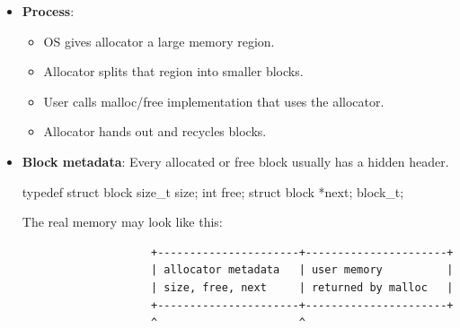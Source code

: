 \documentclass{report}
\begin{document}
\begin{itemize}
                \bigbreak \noindent 
                For mmap allocations, you still need metadata, but you must remember the exact mapping size, because munmap requires the address and length:
                \bigbreak \noindent 
                mmap is naturally page-oriented. If the page size is 4096, then an allocation using mmap generally rounds up to a multiple of the page size.
                \bigbreak \noindent 
                \begin{cppcode}
                    if (size >= MMAP_THRESHOLD) {
                        allocate_with_mmap(size);
                    } else {
                        allocate_from_heap_or_sbrk(size);
                    }
                \end{cppcode}
                \bigbreak \noindent 
                That is closer to how production allocators think: use internal arenas for normal allocations, and direct mappings for large blocks.
            \item \textbf{Process}: 
                \begin{itemize}
                    \item OS gives allocator a large memory region.
                    \item Allocator splits that region into smaller blocks.
                    \item User calls malloc/free implementation that uses the allocator.
                    \item Allocator hands out and recycles blocks.
                \end{itemize}
            \item \textbf{Block metadata}: Every allocated or free block usually has a hidden header.
                \bigbreak \noindent 
                \begin{cppcode}
                typedef struct block {
                    size_t size;
                    int free;
                    struct block *next;
                } block_t;
                \end{cppcode}
                \bigbreak \noindent 
                The real memory may look like this:
                \begin{verbatim}
                    +----------------------+----------------------+
                    | allocator metadata   | user memory          |
                    | size, free, next     | returned by malloc   |
                    +----------------------+----------------------+
                    ^                      ^

\end{verbatim}
\end{itemize}
\end{document}
